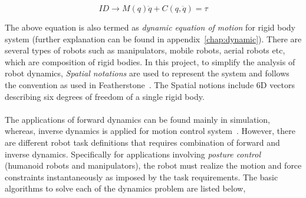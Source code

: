 \begin{equation}
	\label{eq:ID}
	ID \rightarrow M(q)\ddot{q} + C(q, \ddot{q}) = \tau
\end{equation}

The above equation is also termed as \textit{dynamic equation of motion} for rigid body system (further explanation can be found in appendix~\ref{chap:dynamic}). There are several types of robots such as manipulators, mobile robots, aerial robots etc, which are composition of rigid bodies. In this project, to simplify the analysis of robot dynamics, \textit{Spatial notations} are used to represent the system and follows the convention as used in Featherstone~\cite{featherstone2014rigid}. The Spatial notions include 6D vectors describing six degrees of freedom of a single rigid body. 

\paragraph{} The applications of forward dynamics can be found mainly in simulation, whereas, inverse dynamics is applied for motion control system~\cite{featherstone1984robot}. However, there are different robot task definitions that requires combination of forward and inverse dynamics. Specifically for applications involving \textit{posture control} (humanoid robots and manipulators), the robot must realize the motion and force constraints instantaneously as imposed by the task requirements. The basic algorithms to solve each of the dynamics problem are listed below,
